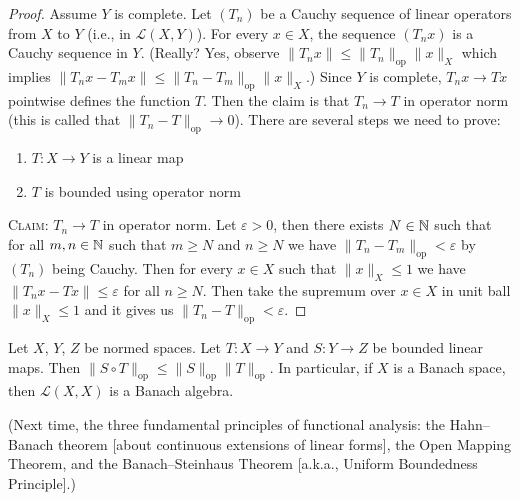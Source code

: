 \begin{proof}
Assume $Y$ is complete. Let $(T_{n})$ be a Cauchy sequence of linear
operators from $X$ to $Y$ (i.e., in $\mathcal{L}(X,Y)$). For every
$x\in X$,
the sequence $(T_{n}x)$ is a Cauchy sequence in $Y$. (Really? Yes,
observe $\|T_{n}x\|\leq\|T_{n}\|_{\text{op}}\|x\|_{X}$ which implies $\|T_{n}x-T_{m}x\|\leq\|T_{n}-T_{m}\|_{\text{op}}\|x\|_{X}$.)
Since $Y$ is complete, $T_{n}x\to Tx$ pointwise defines the function $T$.%
Then the claim is that $T_{n}\to T$ in operator norm (this is called
 that $\|T_{n}-T\|_{\text{op}}\to0$).
There are several steps we need to prove:
\begin{enumerate}
\item $T\colon X\to Y$ is a linear map
\item $T$ is bounded using operator norm
\end{enumerate}
\textsc{Claim}: $T_{n}\to T$ in operator norm. Let $\varepsilon>0$,
then there exists $N\in\mathbb{N}$ such that for all $m,n\in\mathbb{N}$ such that
$m\geq N$ and $n\geq N$ we have $\|T_{n}-T_{m}\|_{\text{op}}<\varepsilon$
by $(T_{n})$ being Cauchy. Then for every $x\in X$ such that
$\|x\|_{X}\leq1$ we have $\|T_{n}x-Tx\|\leq\varepsilon$ for all $n\geq N$.
Then take the supremum over $x\in X$ in unit ball $\|x\|_{X}\leq1$ and
it gives us $\|T_{n}-T\|_{\text{op}}<\varepsilon$.
\end{proof}

\begin{theorem}
Let $X$, $Y$, $Z$ be normed spaces.
Let $T\colon X\to Y$ and $S\colon Y\to Z$ be bounded linear maps.
Then $\|S\circ T\|_{\text{op}}\leq\|S\|_{\text{op}}\|T\|_{\text{op}}$.
In particular, if $X$ is a Banach space, then $\mathcal{L}(X,X)$ is a
Banach algebra.
\end{theorem}

(Next time, the three fundamental principles of functional analysis:
the Hahn--Banach theorem [about continuous extensions of linear
  forms], the Open Mapping Theorem, and the Banach--Steinhaus Theorem [a.k.a., Uniform Boundedness Principle].)